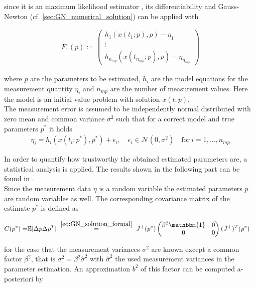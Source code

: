 \documentclass{scrartcl}[12pt, halfparskip]
\numberwithin{equation}{section}
\numberwithin{figure}{section}
\numberwithin{table}{section}
\begin{document}
since it is an maximum likelihood estimator \cite{disseration_andreas_sommer}, its differentiability and Gauss-Newton (cf. \cref{sec:GN_numerical_solution}) can be applied with

\begin{align}
F_1(p) := 
\begin{pmatrix}
h_1(x(t_1;p),p) - \eta_1 \\
\vdots \\
h_{n_{mp}}(x(t_{n_{mp}};p),p) - \eta_{n_{mp}}
\end{pmatrix}
\end{align}

where $p$ are the parameters to be estimated, $h_i$ are the model equations for the measurement quantity $\eta_i$ and $n_{mp}$ are the number of measurement values. Here the model is an initial value problem with solution $x(t;p)$. \\
The measurement error is assumed to be independently normal distributed with zero mean and common variance $\sigma^2$ such that for a correct model and true parameters $p^*$ it holds
\begin{align}
	\eta_i = h_i(x(t_i;p^*),p^*) + \epsilon_i, \quad \epsilon_i \in \mathcal{N}(0,\sigma^2) \quad \text{for} \ i=1,...,n_{mp}
\end{align}


In order to quantify how trustworthy the obtained estimated parameters are, a statistical analysis is applied. The results shown in the following part can be found in \cite{diss_bock}. \\

Since the measurement data $\eta$ is a random variable the estimated parameters $p$ are random variables as well. The corresponding covariance matrix of the estimate $p^*$ is defined as

\begin{align}
	C(p^*) = & \mathbb{E} [ \Delta p \Delta p^T ]
	\ \stackrel{\cref{eq:GN_solution_formal}}{=} \ J^+(p^*)
	\begin{pmatrix}
	\beta^2  \mathbbm{1} & 0 \\
	0 & 0
	\end{pmatrix}
	(J^+)^T(p^*) 
	\label{eq:stat_ana_covariance_matrix}
\end{align}

for the case that the measurement variances $\sigma^2$ are known except a common factor $\beta^2$, that is $\sigma^2 = \beta^2 \hat{\sigma}^2$ with $\hat{\sigma}^2$ the used measurement variances in the parameter estimation. An approximation $b^2$ of this factor can be computed a-posteriori by
\end{document}
